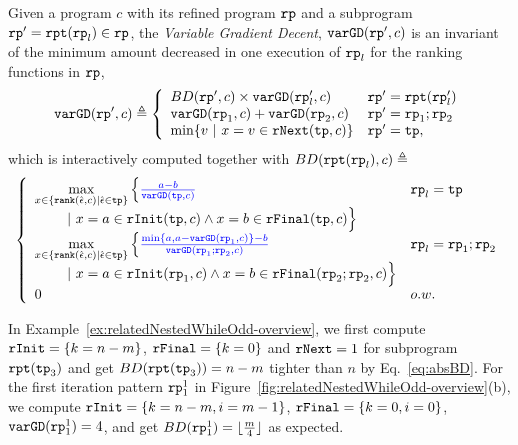 \begin{defn}
\label{def:loopbound}
Given a program $c$ with its refined program $\mathtt{rp}$ and a subprogram $\mathtt{rp}' = \mathtt{rpt}(\mathtt{rp}_l) \in \mathtt{rp}$,
the \emph{Variable Gradient Decent}, 
 $\mathtt{varGD}(\mathtt{rp}', c)$ is an invariant of the minimum amount decreased in one execution of $\mathtt{rp}_l$ for the ranking functions in $\mathtt{rp}$,
{\small
\[
  \varGD(\rprog', c) \triangleq
  \left\{
   \begin{array}{ll}
    BD(\rprog', c)  \times {\varGD(\rprog_l', c)} &  \rprog' = \rprepeat(\rprog_l') \\
    \varGD(\rprog_1, c) + \varGD(\rprog_2, c) & \rprog' = \rprog_1;\rprog_2 \\
    \min\left\{v  ~|~ x = v \in \rfnext(\tpath, c) \right\}   & \rprog' = \tpath, 
    \end{array}
  \right.
 \]
 which is interactively computed together with $BD(\mathtt{rpt}(\mathtt{rp}_l), c) \triangleq$
 \[
  \left\{ 
    \begin{array}{ll}
      \max\limits_{x \in \left\{ \locbound(\absevent, c) | \absevent \in \tpath \right\}} 
      \Big\{ \highlight{\frac{a - b}{\varGD(\tpath, c)}}  &  \rprog_l = \tpath
      \\ \qquad 
      ~\vert~
      x = a \in \rfinit(\tpath, c)
      \land x = b \in \rffinal(\tpath, c)
      \Big\} 
      \\
      \max\limits_{x \in \left\{ \locbound(\absevent, c) | \absevent \in \tpath \right\}} 
      \Big\{ \highlight{\frac{\min\{ a, a - \varGD(\rprog_1, c) \} - b}{\varGD(\rprog_1;\rprog_2, c)}}  
      &  \rprog_l = \rprog_1;\rprog_2
      \\ \qquad 
      ~\vert~
      x = a \in \rfinit(\rprog_1, c)
      \land x = b \in \rffinal(\rprog_2;\rprog_2, c)
      \Big\}   \\
      0  &  o.w.
    \end{array} 
    \right.
\]
}
\end{defn}
In Example~\ref{ex:relatedNestedWhileOdd-overview}, we first compute $\mathtt{rInit} = \{k = n - m\}$, $\mathtt{rFinal} = \{k = 0\}$ and $\mathtt{rNext} = 1$ for subprogram $\mathtt{rpt}(\mathtt{tp}_3)$ and get $BD(\mathtt{rpt}(\mathtt{tp}_3)) = n - m$ tighter than $n$ by Eq.~\ref{eq:absBD}.
For the first iteration pattern $\mathtt{rp}_1^1$ in Figure~\ref{fig:relatedNestedWhileOdd-overview}(b), we compute 
$\mathtt{rInit} = \{k = n - m, i = m - 1\}$, $\mathtt{rFinal} = \{k = 0, i = 0\}$, $\mathtt{varGD}(\mathtt{rp}_1^1) = 4$, and get $BD(\mathtt{rp}_1^1) = \lfloor \frac{m}{4} \rfloor $ as expected.

